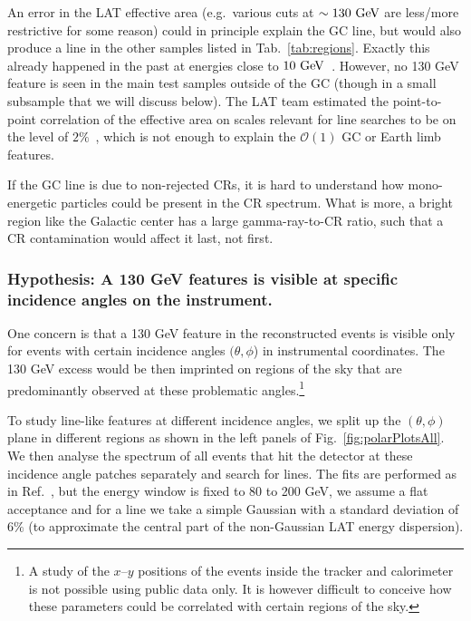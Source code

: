 \documentclass[aps,twocolumn,prd,superscriptaddress,showpacs,nofootinbib,fixfloat]{revtex4}
\newcommand{\GeV}{{\rm ~GeV}}
\newcommand{\degree}{^{\rm o}}
\begin{document}
An error in the LAT effective area (e.g.~various cuts at $\sim130\GeV$ are
less/more restrictive for some reason) %
could
in principle explain the GC line, but would also produce a line in the other
samples listed in Tab.~\ref{tab:regions}. %
Exactly this already happened in the past at energies close to
$10\GeV$~\cite{Ackermann:2012qk}.
However, no 130 GeV feature
is seen in the main test samples outside of the GC (though in a small subsample
that we will discuss below). The LAT team
estimated the point-to-point correlation of the effective area on scales
relevant for line searches to be on the level of
$2\%$~\cite{Fermi:caveatsPASS7},
which is not enough to explain the $\mathcal{O}(1)$ GC or Earth limb features.

If the GC line is due to non-rejected CRs, it is hard to understand how
mono-energetic particles could be present in the CR spectrum. 
What is more,
a bright region like the Galactic center has a large gamma-ray-to-CR
ratio, such that a CR contamination would affect it last, not first.

\subsubsection{Hypothesis: A 130 GeV features is visible
at specific incidence angles on the instrument.}


One concern is that a 130 GeV feature in the
reconstructed events is visible only for events with certain
incidence angles $(\theta, \phi$) in instrumental
coordinates. The 130 GeV excess would be then imprinted on
regions of the sky that are predominantly observed at
these problematic angles.\footnote{A study of the
$x$--$y$ positions of the events inside the tracker and calorimeter
is not possible using public data only.
It is however difficult to conceive how these 
parameters could be correlated with certain regions of the
sky.}

To study line-like features at different incidence
angles, we split up the $(\theta, \phi)$ plane in different
regions as shown in the left panels of
Fig.~\ref{fig:polarPlotsAll}. We then analyse the spectrum
of all events that hit the detector at these incidence
angle patches separately and search for lines. The fits are
performed as in Ref.~\cite{Weniger:2012}, but the energy
window is fixed to 80 to 200 GeV, we assume a flat
acceptance and for a line we take a simple Gaussian with a 
standard deviation of $6\%$ (to approximate the central part of the non-Gaussian
LAT energy dispersion).
\end{document}
